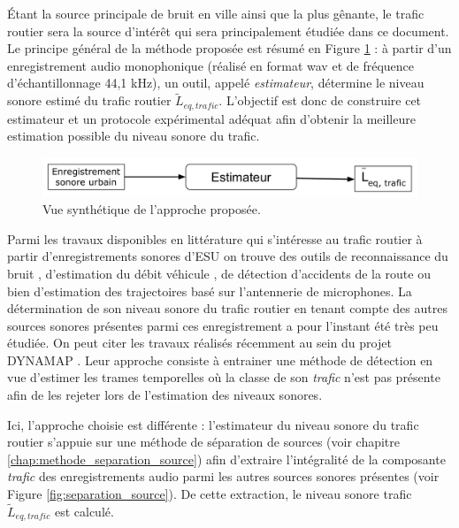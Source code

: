 Étant la source principale de bruit en ville ainsi que la plus gênante, le trafic routier sera la source d'intérêt qui sera principalement étudiée dans ce document. Le principe général de la méthode proposée est résumé en Figure \ref{fig:estimateur0} : à partir d'un enregistrement audio monophonique (réalisé en format wav et de fréquence d'échantillonnage 44,1 kHz), un outil, appelé \textit{estimateur}, détermine le niveau sonore estimé du trafic routier $\tilde{L}_{eq,trafic}$.
L'objectif est donc de construire cet estimateur et un protocole expérimental adéquat afin d'obtenir la meilleure estimation possible du niveau sonore du trafic.\\

\begin{figure}[ht]
\centering
\includegraphics[width=0.7\linewidth]{./figures/NMF/bloc_diagram_estimateur0.pdf}
\caption{Vue synthétique de l'approche proposée.}
\label{fig:estimateur0}
\end{figure}


Parmi les travaux disponibles en littérature qui s'intéresse au trafic routier à partir d'enregistrements sonores d'ESU on trouve des outils de reconnaissance du bruit \cite{defreville_automatic_2006}, d'estimation du débit véhicule \cite{torija2012using}, de détection d'accidents de la route \cite{harlow2001automated} ou bien d'estimation des trajectoires \cite{leiba2017large} basé sur l'antennerie de microphones.
La détermination de son niveau sonore du trafic routier en tenant compte des autres sources sonores présentes parmi ces enregistrement a pour l'instant été très peu étudiée. On peut citer les travaux réalisés récemment au sein du projet DYNAMAP \cite{socoro2017anomalous}. Leur approche consiste à entrainer une méthode de détection en vue d'estimer les trames temporelles où la classe de son \textit{trafic} n'est pas présente afin de les rejeter lors de l'estimation des niveaux sonores. 

Ici, l'approche choisie est différente : l'estimateur du niveau sonore du trafic routier s'appuie sur une méthode de séparation de sources (voir chapitre \ref{chap:methode_separation_source}) afin d'extraire l'intégralité de la composante \textit{trafic} des enregistrements audio parmi les autres sources sonores présentes (voir Figure \ref{fig:separation_source}). De cette extraction, le niveau sonore trafic $\tilde{L}_{eq,trafic}$ est calculé.

